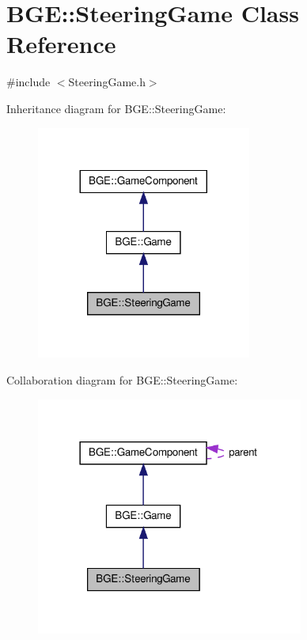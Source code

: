 \hypertarget{class_b_g_e_1_1_steering_game}{\section{B\-G\-E\-:\-:Steering\-Game Class Reference}
\label{class_b_g_e_1_1_steering_game}
}


{\ttfamily \#include $<$Steering\-Game.\-h$>$}



Inheritance diagram for B\-G\-E\-:\-:Steering\-Game\-:
\nopagebreak
\begin{figure}[H]
\begin{center}
\leavevmode
\includegraphics[width=200pt]{class_b_g_e_1_1_steering_game__inherit__graph}
\end{center}
\end{figure}


Collaboration diagram for B\-G\-E\-:\-:Steering\-Game\-:
\nopagebreak
\begin{figure}[H]
\begin{center}
\leavevmode
\includegraphics[width=249pt]{class_b_g_e_1_1_steering_game__coll__graph}
\end{center}
\end{figure}
